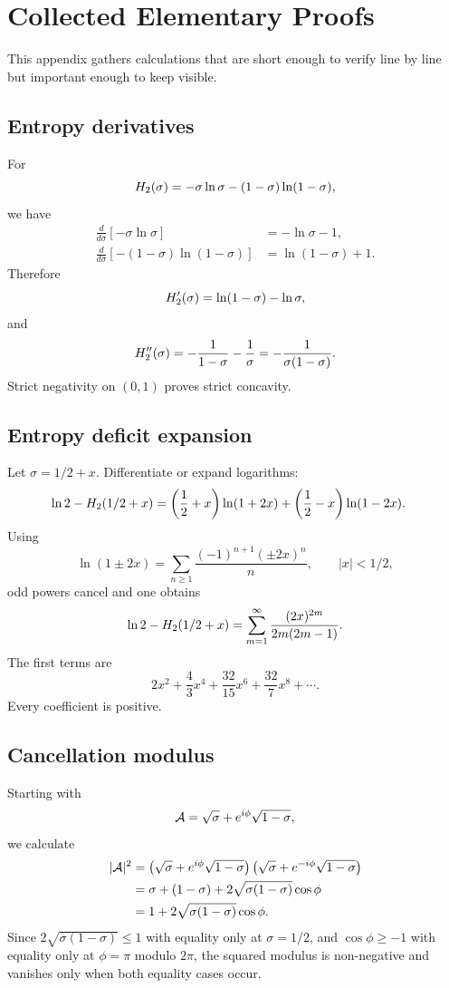 \chapter{Collected Elementary Proofs}
\label{app:proofs}

This appendix gathers calculations that are short enough to verify line by line but important enough to keep visible.

\section{Entropy derivatives}

For
\[
 H_2(\sigma)=-\sigma\ln\sigma-(1-\sigma)\ln(1-\sigma),
\]
we have
\begin{align*}
 \frac{d}{d\sigma}[-\sigma\ln\sigma]&=-\ln\sigma-1,\\
 \frac{d}{d\sigma}[-(1-\sigma)\ln(1-\sigma)]&=\ln(1-\sigma)+1.
\end{align*}
Therefore
\[
 H_2'(\sigma)=\ln(1-\sigma)-\ln\sigma,
\]
and
\[
 H_2''(\sigma)=-\frac{1}{1-\sigma}-\frac{1}{\sigma}
 =-\frac{1}{\sigma(1-\sigma)}.
\]
Strict negativity on $(0,1)$ proves strict concavity.

\section{Entropy deficit expansion}

Let $\sigma=1/2+x$. Differentiate or expand logarithms:
\begin{align*}
 \ln2-H_2(1/2+x)
 &=\left(\frac12+x\right)\ln(1+2x)
 +\left(\frac12-x\right)\ln(1-2x).
\end{align*}
Using
\[
 \ln(1\pm2x)=\sum_{n\ge1}\frac{(-1)^{n+1}(\pm2x)^n}{n},
 \qquad |x|<1/2,
\]
odd powers cancel and one obtains
\[
 \ln2-H_2(1/2+x)
 =\sum_{m=1}^{\infty}\frac{(2x)^{2m}}{2m(2m-1)}.
\]
The first terms are
\[
 2x^2+\frac43x^4+\frac{32}{15}x^6+\frac{32}{7}x^8+\cdots.
\]
Every coefficient is positive.

\section{Cancellation modulus}

Starting with
\[
 \mathcal{A}=\sqrt\sigma+e^{i\phi}\sqrt{1-\sigma},
\]
we calculate
\begin{align*}
 |\mathcal{A}|^2
 &=\left(\sqrt\sigma+e^{i\phi}\sqrt{1-\sigma}\right)
 \left(\sqrt\sigma+e^{-i\phi}\sqrt{1-\sigma}\right)\\
 &=\sigma+(1-\sigma)+2\sqrt{\sigma(1-\sigma)}\cos\phi\\
 &=1+2\sqrt{\sigma(1-\sigma)}\cos\phi.
\end{align*}
Since $2\sqrt{\sigma(1-\sigma)}\le1$ with equality only at $\sigma=1/2$, and $\cos\phi\ge-1$ with equality only at $\phi=\pi$ modulo $2\pi$, the squared modulus is non-negative and vanishes only when both equality cases occur.

